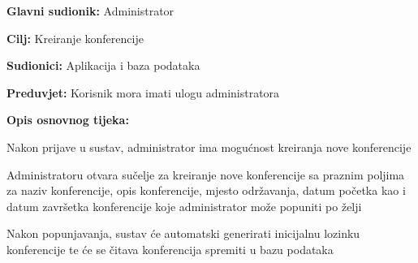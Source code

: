 				\noindent {}
				\begin{packed_item}
					
					\item \textbf{Glavni sudionik: } Administrator
					\item  \textbf{Cilj:} Kreiranje konferencije
					\item  \textbf{Sudionici:} Aplikacija i baza podataka
					\item  \textbf{Preduvjet:} Korisnik mora imati ulogu administratora
					\item  \textbf{Opis osnovnog tijeka:}
					
					\item[] \begin{packed_enum}
						
						\item Nakon prijave u sustav, administrator ima mogućnost kreiranja nove konferencije
						\item Administratoru otvara sučelje za kreiranje nove konferencije sa praznim poljima za naziv konferencije, opis konferencije, mjesto održavanja, datum početka kao i datum završetka konferencije koje administrator može popuniti po želji
						\item Nakon popunjavanja, sustav će automatski generirati inicijalnu lozinku konferencije te će se čitava konferencija spremiti u bazu podataka
					\end{packed_enum}
	
					
					
				\end{packed_item}
				
